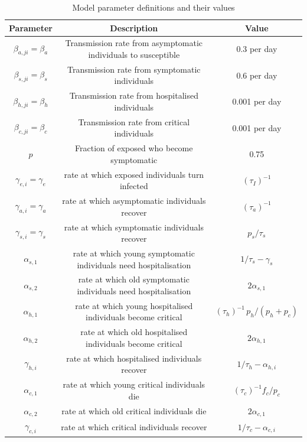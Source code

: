 \documentclass{article}
\begin{document}
\begin{table}[htp]
\caption{Model parameter definitions and their values}
\begin{center}
\begin{tabular}{|c|c|c|}
\hline
Parameter & Description & Value \\ \hline
$\beta_{a,ji} = \beta_a$ & Transmission rate from asymptomatic individuals to susceptible  & 0.3 per day \\
$\beta_{s,ji} = \beta_s$ & Transmission rate from symptomatic individuals & 0.6 per day \\
$\beta_{h,ji} = \beta_h$ & Transmission rate from hospitalised individuals & 0.001 per day \\
$\beta_{c,ji} = \beta_c$ & Transmission rate from critical individuals & 0.001 per day \\
$p$ & Fraction of exposed who become symptomatic & 0.75 \\
$\gamma_{e,i} = \gamma_e$ & rate at which exposed individuals turn infected & $(\tau_I)^{-1}$ \\
$\gamma_{a,i} = \gamma_a$ & rate at which asymptomatic individuals recover & $(\tau_a)^{-1}$   \\
$\gamma_{s,i} = \gamma_s$ & rate at which symptomatic individuals recover & $p_s / \tau_s$ \\
$\alpha_{s,1}$ & rate at which young symptomatic individuals need hospitalisation &  $1/\tau_s - \gamma_s$ \\
$\alpha_{s,2}$ & rate at which old symptomatic individuals need hospitalisation &  $2\alpha_{s,1}$ \\
$\alpha_{h,1}$ & rate at which young hospitalised individuals become critical & $(\tau_h)^{-1} \, p_h /(p_h + p_c)$  \\
$\alpha_{h,2}$ & rate at which old hospitalised individuals become critical & $ 2 \alpha_{h,1}$ \\
$\gamma_{h,i}$ & rate at which hospitalised individuals recover &  $1/\tau_h - \alpha_{h,i}$ \\
$\alpha_{c,1}$ & rate at which young critical individuals die & $(\tau_c)^{-1} f_c / p_c $ \\
$\alpha_{c,2}$ & rate at which old critical individuals die & $2 \alpha_{c,1}$ \\
$\gamma_{c,i}$ & rate at which critical individuals recover &  $ 1/\tau_c - \alpha_{c,i}$  \\
\hline
\end{tabular}
\end{center}
\label{basic-seir:params}
\end{table}%
\end{document}
